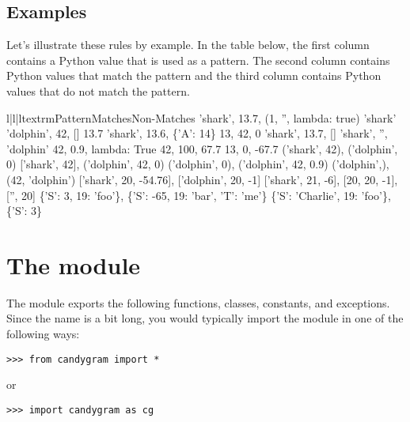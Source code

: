 \documentclass{howto}
\newcommand{\lessthan}[0]{\begin{math}<\end{math}}
\newcommand{\greaterthan}[0]{\begin{math}>\end{math}}
\newcommand{\lessthan}[0]{<}
\newcommand{\greaterthan}[0]{>}
\begin{document}
\subsection{Examples}
Let's illustrate these rules by example. In the table below, the first column
contains a Python value that is used as a pattern. The second column contains
Python values that match the pattern and the third column contains Python values
that do not match the pattern.
\begin{tableiii}{l|l|l}{textrm}{Pattern}{Matches}{Non-Matches}
	{'shark', 13.7, (1, '', lambda: true)}
	{}
	{'shark'}
	{'dolphin', 42, []}
	{13.7}
	{'shark', 13.6, \{'A': 14\}}
	{13, 42, 0}
	{'shark', 13.7, []}
	{'shark', '', 'dolphin'}
	{42, 0.9, lambda: True}
\lineiii{lambda x: x \greaterthan\ 20}
	{42, 100, 67.7}
	{13, 0, -67.7}
	{('shark', 42), ('dolphin', 0)}
	{['shark', 42], ('dolphin', 42, 0)}
	{('dolphin', 0), ('dolphin', 42, 0.9)}
	{('dolphin',), (42, 'dolphin')}
\lineiii{[str, 20, lambda x: x \lessthan\ 0]}
	{['shark', 20, -54.76], ['dolphin', 20, -1]}
	{['shark', 21, -6], [20, 20, -1], ['', 20]}
	{\{'S': 3, 19: 'foo'\}, \{'S': -65, 19: 'bar', 'T': 'me'\}}
	{\{'S': 'Charlie', 19: 'foo'\}, \{'S': 3\}}
\end{tableiii}



\section{The  module}


The  module exports the following functions, classes,
constants, and exceptions. Since the name  is a bit long, you
would typically import the module in one of the following ways:
\begin{verbatim}
>>> from candygram import *
\end{verbatim}
or
\begin{verbatim}
>>> import candygram as cg
\end{verbatim}



\end{document}
